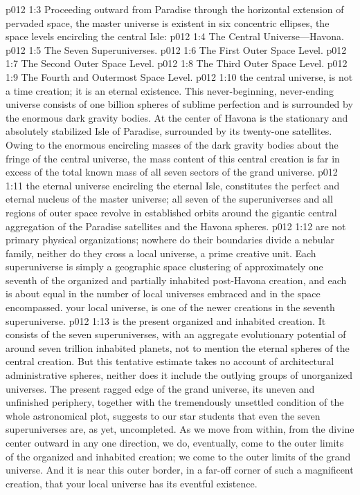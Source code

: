 \pc \vs p012 1:3 Proceeding outward from Paradise through the horizontal extension of pervaded space, the master universe is existent in six concentric ellipses, the space levels encircling the central Isle:
\pc \vs p012 1:4 \bibnobreakspace The Central Universe---Havona.
\vs p012 1:5 \bibnobreakspace The Seven Superuniverses.
\vs p012 1:6 \bibnobreakspace The First Outer Space Level.
\vs p012 1:7 \bibnobreakspace The Second Outer Space Level.
\vs p012 1:8 \bibnobreakspace The Third Outer Space Level.
\vs p012 1:9 \bibnobreakspace The Fourth and Outermost Space Level.
\pc \vs p012 1:10  the central universe, is not a time creation; it is an eternal existence. This never\hyp{}beginning, never\hyp{}ending universe consists of one billion spheres of sublime perfection and is surrounded by the enormous dark gravity bodies. At the center of Havona is the stationary and absolutely stabilized Isle of Paradise, surrounded by its twenty\hyp{}one satellites. Owing to the enormous encircling masses of the dark gravity bodies about the fringe of the central universe, the mass content of this central creation is far in excess of the total known mass of all seven sectors of the grand universe.
\pc \vs p012 1:11  the eternal universe encircling the eternal Isle, constitutes the perfect and eternal nucleus of the master universe; all seven of the superuniverses and all regions of outer space revolve in established orbits around the gigantic central aggregation of the Paradise satellites and the Havona spheres.
\vs p012 1:12  are not primary physical organizations; nowhere do their boundaries divide a nebular family, neither do they cross a local universe, a prime creative unit. Each superuniverse is simply a geographic space clustering of approximately one seventh of the organized and partially inhabited post\hyp{}Havona creation, and each is about equal in the number of local universes embraced and in the space encompassed.  your local universe, is one of the newer creations in  the seventh superuniverse.
\vs p012 1:13  is the present organized and inhabited creation. It consists of the seven superuniverses, with an aggregate evolutionary potential of around seven trillion inhabited planets, not to mention the eternal spheres of the central creation. But this tentative estimate takes no account of architectural administrative spheres, neither does it include the outlying groups of unorganized universes. The present ragged edge of the grand universe, its uneven and unfinished periphery, together with the tremendously unsettled condition of the whole astronomical plot, suggests to our star students that even the seven superuniverses are, as yet, uncompleted. As we move from within, from the divine center outward in any one direction, we do, eventually, come to the outer limits of the organized and inhabited creation; we come to the outer limits of the grand universe. And it is near this outer border, in a far\hyp{}off corner of such a magnificent creation, that your local universe has its eventful existence.
